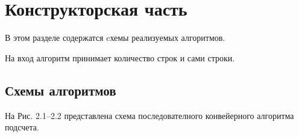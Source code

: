 \documentclass[12pt]{report}
\begin{document}
\chapter{Конструкторская часть}
В этом разделе содержатся cхемы реализуемых алгоритмов.

На вход алгоритм принимает количество строк и сами строки.
	
\section{Схемы алгоритмов}
На Рис. 2.1–2.2 представлена схема последователного конвейерного алгоритма подсчета.

\vspace{\baselineskip}

\begin{figure}[h]

\end{figure}
\end{document}
